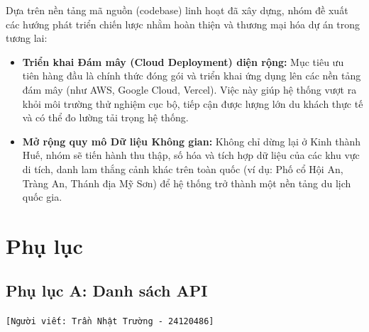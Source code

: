 Dựa trên nền tảng mã nguồn (codebase) linh hoạt đã xây dựng, nhóm đề xuất các hướng phát triển chiến lược nhằm hoàn thiện và thương mại hóa dự án trong tương lai:
\begin{itemize}
    \item \textbf{Triển khai Đám mây (Cloud Deployment) diện rộng:} Mục tiêu ưu tiên hàng đầu là chính thức đóng gói và triển khai ứng dụng lên các nền tảng đám mây (như AWS, Google Cloud, Vercel). Việc này giúp hệ thống vượt ra khỏi môi trường thử nghiệm cục bộ, tiếp cận được lượng lớn du khách thực tế và có thể đo lường tải trọng hệ thống.
    \item \textbf{Mở rộng quy mô Dữ liệu Không gian:} Không chỉ dừng lại ở Kinh thành Huế, nhóm sẽ tiến hành thu thập, số hóa và tích hợp dữ liệu của các khu vực di tích, danh lam thắng cảnh khác trên toàn quốc (ví dụ: Phố cổ Hội An, Tràng An, Thánh địa Mỹ Sơn) để hệ thống trở thành một nền tảng du lịch quốc gia.
\end{itemize}

\section{Phụ lục}

\subsection{Phụ lục A: Danh sách API}
\texttt{[Người viết: Trần Nhật Trường - 24120486]}

